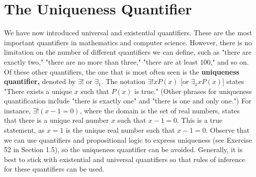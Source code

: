 \documentclass{Axon}
\begin{document}
\section{The Uniqueness Quantifier}
We have now introduced universal and existential quantifiers. These are the most important quantifiers in mathematics and computer science. However, there is no limitation on the number of different quantifiers we can define, such as "there are exactly two," "there are no more than three," "there are at least \(100\)," and so on. Of these other quantifiers, the one that is most often seen is the \textbf{uniqueness quantifier,} denoted by \(\exists!\) or \(\exists_1\). The notation \(\exists ! x P(x)\) [or \(\exists_1 x P(x)\)] states "There exists a unique \(x\) such that \(P(x)\) is true." (Other phrases for uniqueness quantification include "there is exactly one" and "there is one and only one.") For instance, \(\exists ! (x - 1 = 0)\), where the domain is the set of real numbers, states that there is a unique real number \(x\) such that \(x - 1 = 0\). This is a true statement, as \(x = 1\) is the unique real number such that \(x - 1 = 0\). Observe that we can use quantifiers and propositional logic to express uniqueness (see Exercise 52 in Section 1.5), so the uniqueness quantifier can be avoided. Generally, it is best to stick with existential and universal quantifiers so that rules of inference for these quantifiers can be used.

\printbibliography
\end{document}
